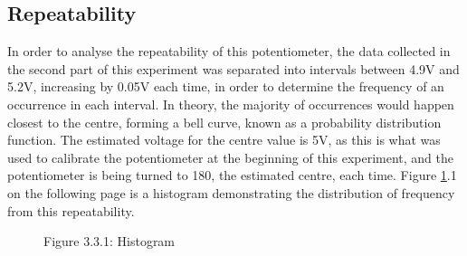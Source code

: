 \documentclass[a4,11pt]{article}
\begin{document}
\subsection{Repeatability}
In order to analyse the repeatability of this potentiometer, the data collected in the second part of this experiment was separated into intervals between 4.9V and 5.2V, increasing by 0.05V each time, in order to determine the frequency of an occurrence in each interval. In theory, the majority of occurrences would happen closest to the centre, forming a bell curve, known as a probability distribution function. The estimated voltage for the centre value is 5V, as this is what was used to calibrate the potentiometer at the beginning of this experiment, and the potentiometer is being turned to 180\degree, the estimated centre, each time. Figure \ref{fig:histogram}.1 on the following page is a histogram demonstrating the distribution of frequency from this repeatability.

\begin{figure}[h]
	\centering
	\label{fig:histogram}
	Figure 3.3.1: Histogram
\end{figure}
\end{document}
